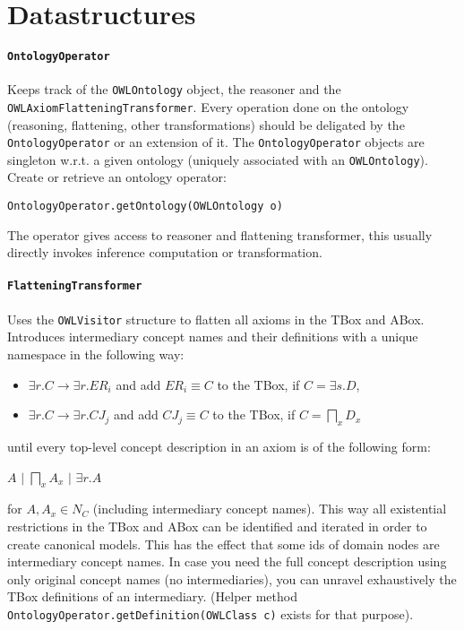\documentclass{article}
\begin{document}
\section{Datastructures}

\paragraph{\texttt{OntologyOperator}}
Keeps track of the \texttt{OWLOntology} object, the reasoner and the
\texttt{OWLAxiomFlatteningTransformer}. Every operation done on the ontology
(reasoning, flattening, other transformations) should be deligated by the
\texttt{OntologyOperator} or an extension of it. The \texttt{OntologyOperator}
objects are singleton w.r.t. a given ontology (uniquely associated with an
\texttt{OWLOntology}). Create or retrieve an ontology operator:

\texttt{OntologyOperator.getOntology(OWLOntology o)}

The operator gives access to reasoner and flattening transformer, this usually
directly invokes inference computation or transformation.

\paragraph{\texttt{FlatteningTransformer}} Uses the \texttt{OWLVisitor}
structure to flatten all axioms in the TBox and ABox. Introduces intermediary concept names
and their definitions with a unique namespace in the following way:
\begin{itemize}
  \item $\exists r. C \longrightarrow \exists r. ER_i$ and add $ER_i \equiv C$
  to the TBox, if $C = \exists s.D$,
  \item $\exists r. C \longrightarrow \exists r. CJ_j$ and add $CJ_j \equiv C$
  to the TBox, if $C = \bigsqcap\limits_x D_x$
\end{itemize}
until every top-level concept description in an axiom is of the following form:
\begin{center}
$A$ $|$ $\bigsqcap\limits_x A_x$ $|$ $\exists r.A$
\end{center}
for $A,A_x\in N_C$ (including intermediary concept names). This way all
existential restrictions in the TBox and ABox can be identified and iterated in
order to create canonical models. This has the effect that some ids of domain
nodes are intermediary concept names. In case you need the full concept
description using only original concept names (no intermediaries), you can
unravel exhaustively the TBox definitions of an intermediary. (Helper method
\texttt{OntologyOperator.getDefinition(OWLClass c)} exists for that purpose).
\end{document}
